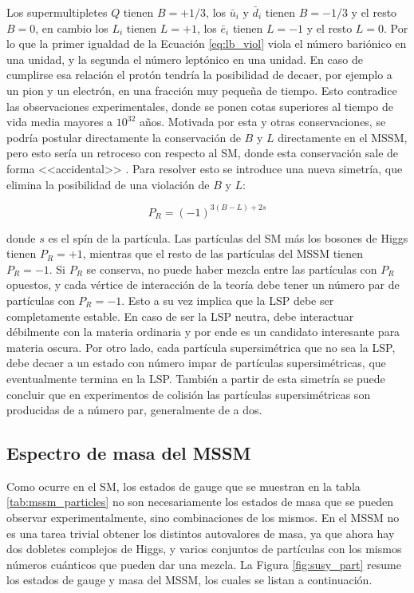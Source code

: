 Los supermultipletes $Q$ tienen $B=+1/3$, los $\bar{u}_i$ y $\bar{d}_i$ tienen $B=-1/3$ y el resto $B=0$, en cambio los $L_i$ tienen $L=+1$, los $\bar{e}_i$ tienen $L=-1$ y el resto $L=0$. Por lo que la primer igualdad de la Ecuación \ref{eq:lb_viol} viola el número bariónico en una unidad, y la segunda el número leptónico en una unidad. En caso de cumplirse esa relación el protón tendría la posibilidad de decaer, por ejemplo a un pion y un electrón, en una fracción muy pequeña de tiempo. Esto contradice las observaciones experimentales, donde se ponen cotas superiores al tiempo de vida media mayores a $10^{32}$ años. Motivada por esta y otras conservaciones, se podría postular directamente la conservación de $B$ y $L$ directamente en el MSSM, pero esto sería un retroceso con respecto al SM, donde esta conservación sale de forma 
<<accidental>>
. Para resolver esto se introduce una nueva simetría, que elimina la posibilidad de una violación de $B$ y $L$:

\begin{equation}
	P_R = (-1)^{3(B-L)+2s}
\end{equation}

\noindent
donde $s$ es el spín de la partícula. Las partículas del SM más los bosones de Higgs tienen $P_R = +1$, mientras que el resto de las partículas del MSSM tienen $P_R = -1$. Si $P_R$ se conserva, no puede haber mezcla entre las partículas con $P_R$ opuestos, y cada vértice de interacción de la teoría debe tener un número par de partículas con $P_R=-1$. Esto a su vez implica que la LSP debe ser completamente estable. En caso de ser la LSP neutra, debe interactuar débilmente con la materia ordinaria y por ende es un candidato interesante para materia oscura. Por otro lado, cada partícula supersimétrica que no sea la LSP, debe decaer a un estado con número impar de partículas supersimétricas, que eventualmente termina en la LSP. También a partir de esta simetría se puede concluir que en experimentos de colisión las partículas supersimétricas son producidas de a número par, generalmente de a dos.



\subsection{Espectro de masa del MSSM}

Como ocurre en el SM, los estados de gauge que se muestran en la tabla \ref{tab:mssm_particles} no son necesariamente los estados de masa que se pueden observar experimentalmente, sino combinaciones de los mismos. En el MSSM no es una tarea trivial obtener los distintos autovalores de masa, ya que ahora hay dos dobletes complejos de Higgs, y varios conjuntos de partículas con los mismos números cuánticos que pueden dar una mezcla. La Figura \ref{fig:susy_part} resume los estados de gauge y masa del MSSM, los cuales se listan a continuación.

